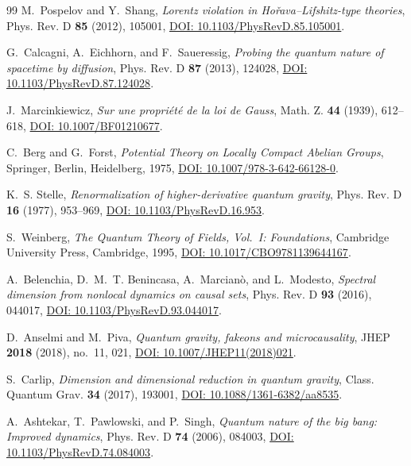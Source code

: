 \documentclass[11pt,a4paper,reqno]{amsart}
\theoremstyle{definition}
\numberwithin{equation}{section}
\begin{document}
\begin{thebibliography}{99}
M.~Pospelov and Y.~Shang,
\emph{Lorentz violation in Ho\v{r}ava--Lifshitz-type theories},
Phys. Rev. D \textbf{85} (2012), 105001, \href{https://doi.org/10.1103/PhysRevD.85.105001}{DOI: 10.1103/PhysRevD.85.105001}.

G.~Calcagni, A.~Eichhorn, and F.~Saueressig,
\emph{Probing the quantum nature of spacetime by diffusion},
Phys. Rev. D \textbf{87} (2013), 124028, \href{https://doi.org/10.1103/PhysRevD.87.124028}{DOI: 10.1103/PhysRevD.87.124028}.

J.~Marcinkiewicz,
\emph{Sur une propri\'et\'e de la loi de Gauss},
Math. Z. \textbf{44} (1939), 612--618, \href{https://doi.org/10.1007/BF01210677}{DOI: 10.1007/BF01210677}.

C.~Berg and G.~Forst,
\emph{Potential Theory on Locally Compact Abelian Groups},
Springer, Berlin, Heidelberg, 1975, \href{https://doi.org/10.1007/978-3-642-66128-0}{DOI: 10.1007/978-3-642-66128-0}.

K.~S. Stelle,
\emph{Renormalization of higher-derivative quantum gravity},
Phys. Rev. D \textbf{16} (1977), 953--969, \href{https://doi.org/10.1103/PhysRevD.16.953}{DOI: 10.1103/PhysRevD.16.953}.

S.~Weinberg,
\emph{The Quantum Theory of Fields, Vol.~I: Foundations},
Cambridge University Press, Cambridge, 1995, \href{https://doi.org/10.1017/CBO9781139644167}{DOI: 10.1017/CBO9781139644167}.

A.~Belenchia, D.~M.~T. Benincasa, A.~Marcian\`o, and L.~Modesto,
\emph{Spectral dimension from nonlocal dynamics on causal sets},
Phys. Rev. D \textbf{93} (2016), 044017, \href{https://doi.org/10.1103/PhysRevD.93.044017}{DOI: 10.1103/PhysRevD.93.044017}.

D.~Anselmi and M.~Piva,
\emph{Quantum gravity, fakeons and microcausality},
JHEP \textbf{2018} (2018), no.~11, 021, \href{https://doi.org/10.1007/JHEP11(2018)021}{DOI: 10.1007/JHEP11(2018)021}.

S.~Carlip,
\emph{Dimension and dimensional reduction in quantum gravity},
Class. Quantum Grav. \textbf{34} (2017), 193001, \href{https://doi.org/10.1088/1361-6382/aa8535}{DOI: 10.1088/1361-6382/aa8535}.

A.~Ashtekar, T.~Pawlowski, and P.~Singh,
\emph{Quantum nature of the big bang: Improved dynamics},
Phys. Rev. D \textbf{74} (2006), 084003, \href{https://doi.org/10.1103/PhysRevD.74.084003}{DOI: 10.1103/PhysRevD.74.084003}.


\end{thebibliography}
\end{document}
